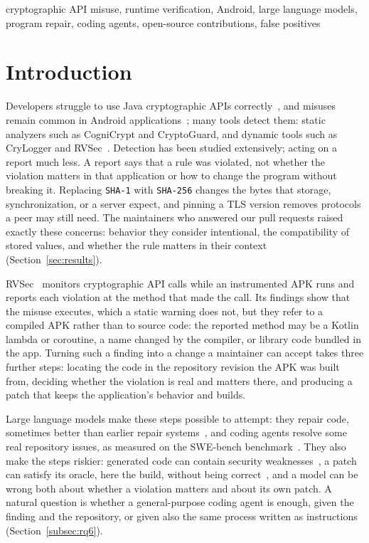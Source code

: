 \documentclass[conference]{IEEEtran}
\begin{document}
\begin{IEEEkeywords}
cryptographic API misuse, runtime verification, Android, large language
models, program repair, coding agents, open-source contributions, false
positives
\end{IEEEkeywords}

\section{Introduction}
\label{sec:introduction}

Developers struggle to use Java cryptographic APIs
correctly~\cite{nadi2016hoops}, and misuses remain common in Android
applications~\cite{egele2013crypto,costa2026rv4android}; many tools detect
them: static analyzers such as CogniCrypt and CryptoGuard, and dynamic tools
such as CryLogger and RVSec~\cite{krueger2017cognicrypt,krueger2021crysl,
rahaman2019cryptoguard,piccolboni2021crylogger,torres2023runtime}. Detection has
been studied extensively; acting on a report much less. A report says that a
rule was violated, not whether the violation matters in that application or how
to change the program without breaking it. Replacing \texttt{SHA-1} with
\texttt{SHA-256} changes the bytes that storage, synchronization, or a server
expect, and pinning a TLS version removes protocols a peer may still need. The
maintainers who answered our pull requests raised exactly these concerns:
behavior they consider intentional, the compatibility of stored values, and
whether the rule matters in their context (Section~\ref{sec:results}).

RVSec~\cite{torres2023runtime,costa2026rv4android} monitors cryptographic API calls while an
instrumented APK runs and reports each violation at the method that made the
call. Its findings show that the misuse executes, which a static warning does
not, but they refer to a compiled APK rather than to source code: the reported
method may be a Kotlin lambda or coroutine, a name changed by the compiler, or
library code bundled in the app. Turning such a finding into a change a
maintainer can accept takes three further steps: locating the code in the
repository revision the APK was built from, deciding whether the violation is
real and matters there, and producing a patch that keeps the application's
behavior and builds.

Large language models make these steps possible to attempt: they repair code,
sometimes better than earlier repair
systems~\cite{xia2023apr,zhang2023apimisuse}, and coding agents resolve some real
repository issues, as measured on the SWE-bench
benchmark~\cite{jimenez2024swebench,yang2024sweagent}. They also make the steps riskier: generated code can contain security
weaknesses~\cite{pearce2022asleep}, a patch can satisfy its oracle, here the
build, without being correct~\cite{smith2015overfitting}, and a model can be
wrong both about whether a violation matters and about its own patch. A
natural question is whether a general-purpose coding agent is enough, given the
finding and the repository, or given also the same process written as
instructions (Section~\ref{subsec:rq6}).
\end{document}
